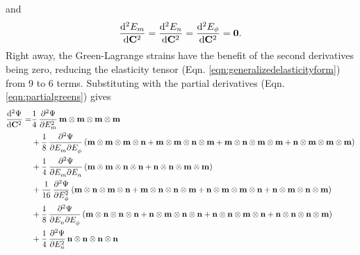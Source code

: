 and 
\begin{equation}
\dod[2]{E_m}{\mathbf{C}} = \dod[2]{E_n}{\mathbf{C}} = \dod[2]{E_\phi}{\mathbf{C}} = \mathbf{0}.
\end{equation}
Right away, the Green-Lagrange strains have the benefit of the second derivatives being zero, reducing the elasticity tensor (Eqn. \ref{eqn:generalizedelasticityform}) from 9 to 6 terms. Substituting with the partial derivatives (Eqn. \ref{eqn:partialgreens}) gives
\begin{equation}\label{eqn:greenelasticityform}
\begin{aligned}
\dod[2]{\Psi}{\mathbf{C}} =
	& \frac{1}{4}\dpd[2]{\Psi}{E_m} \mathbf{m}\otimes\mathbf{m}\otimes\mathbf{m}\otimes\mathbf{m}	\\
    &+ \frac{1}{8}\dmd{\Psi}{2}{E_m}{}{E_\phi}{} 
    	\left(
        	\mathbf{m}\otimes\mathbf{m}\otimes\mathbf{m}\otimes\mathbf{n}
            +\mathbf{m}\otimes\mathbf{m}\otimes\mathbf{n}\otimes\mathbf{m}
            +\mathbf{m}\otimes\mathbf{n}\otimes\mathbf{m}\otimes\mathbf{m}
            +\mathbf{n}\otimes\mathbf{m}\otimes\mathbf{m}\otimes\mathbf{m}
        \right)	\\
    &+ \frac{1}{4}\dmd{\Psi}{2}{E_m}{}{E_n}{} 
    	\left(
        	\mathbf{m}\otimes\mathbf{m}\otimes\mathbf{n}\otimes\mathbf{n}
            +\mathbf{n}\otimes\mathbf{n}\otimes\mathbf{m}\otimes\mathbf{m}
        \right)	\\
    &+ \frac{1}{16}\dpd[2]{\Psi}{E_\phi} 
    	\left(
        	\mathbf{m}\otimes\mathbf{n}\otimes\mathbf{m}\otimes\mathbf{n}
            +\mathbf{m}\otimes\mathbf{n}\otimes\mathbf{n}\otimes\mathbf{m}
            +\mathbf{n}\otimes\mathbf{m}\otimes\mathbf{m}\otimes\mathbf{n}
            +\mathbf{n}\otimes\mathbf{m}\otimes\mathbf{n}\otimes\mathbf{m}
        \right)	\\
    &+ \frac{1}{8}\dmd{\Psi}{2}{E_n}{}{E_\phi}{} 
    	\left(
        	\mathbf{m}\otimes\mathbf{n}\otimes\mathbf{n}\otimes\mathbf{n}
            +\mathbf{n}\otimes\mathbf{m}\otimes\mathbf{n}\otimes\mathbf{n}
            +\mathbf{n}\otimes\mathbf{n}\otimes\mathbf{m}\otimes\mathbf{n}
            +\mathbf{n}\otimes\mathbf{n}\otimes\mathbf{n}\otimes\mathbf{m}
        \right)	\\
    &+ \frac{1}{4} \dpd[2]{\Psi}{E_n} \mathbf{n}\otimes\mathbf{n}\otimes\mathbf{n}\otimes\mathbf{n}	\\
\end{aligned}
\end{equation}


